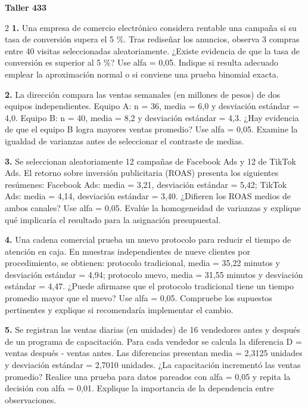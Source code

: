\documentclass[14pt,letterpaper]{article}
\begin{document}
\begin{center}\Large\bfseries Taller 433\end{center}
\vspace{4pt}
\fontsize{10.2}{12.0}\selectfont
\begin{multicols}{2}
\noindent\textbf{1.} Una empresa de comercio electrónico considera rentable una campaña si su tasa de conversión supera el 5 \%. Tras rediseñar los anuncios, observa 3 compras entre 40 visitas seleccionadas aleatoriamente. ¿Existe evidencia de que la tasa de conversión es superior al 5 \%? Use alfa = 0,05. Indique si resulta adecuado emplear la aproximación normal o si conviene una prueba binomial exacta.\par\vspace{20pt}
\noindent\textbf{2.} La dirección compara las ventas semanales (en millones de pesos) de dos equipos independientes. Equipo A: n = 36, media = 6,0 y desviación estándar = 4,0. Equipo B: n = 40, media = 8,2 y desviación estándar = 4,3. ¿Hay evidencia de que el equipo B logra mayores ventas promedio? Use alfa = 0,05. Examine la igualdad de varianzas antes de seleccionar el contraste de medias.\par\vspace{20pt}
\noindent\textbf{3.} Se seleccionan aleatoriamente 12 campañas de Facebook Ads y 12 de TikTok Ads. El retorno sobre inversión publicitaria (ROAS) presenta los siguientes resúmenes: Facebook Ads: media = 3,21, desviación estándar = 5,42; TikTok Ads: media = 4,14, desviación estándar = 3,40. ¿Difieren los ROAS medios de ambos canales? Use alfa = 0,05. Evalúe la homogeneidad de varianzas y explique qué implicaría el resultado para la asignación presupuestal.\par\vspace{20pt}
\noindent\textbf{4.} Una cadena comercial prueba un nuevo protocolo para reducir el tiempo de atención en caja. En muestras independientes de nueve clientes por procedimiento, se obtienen: protocolo tradicional, media = 35,22 minutos y desviación estándar = 4,94; protocolo nuevo, media = 31,55 minutos y desviación estándar = 4,47. ¿Puede afirmarse que el protocolo tradicional tiene un tiempo promedio mayor que el nuevo? Use alfa = 0,05. Compruebe los supuestos pertinentes y explique si recomendaría implementar el cambio.\par\vspace{20pt}
\noindent\textbf{5.} Se registran las ventas diarias (en unidades) de 16 vendedores antes y después de un programa de capacitación. Para cada vendedor se calcula la diferencia D = ventas después - ventas antes. Las diferencias presentan media = 2,3125 unidades y desviación estándar = 2,7010 unidades. ¿La capacitación incrementó las ventas promedio? Realice una prueba para datos pareados con alfa = 0,05 y repita la decisión con alfa = 0,01. Explique la importancia de la dependencia entre observaciones.\par\vspace{20pt}

\end{multicols}
\end{document}
